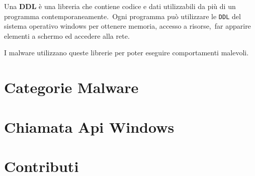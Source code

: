 Una \textbf{DDL} è una libreria che contiene codice e dati utilizzabili da più di un programma contemporaneamente.\
Ogni programma può utilizzare le \texttt{DDL} del sistema operativo windows per ottenere memoria, accesso a risorse,\
far apparire elementi a schermo ed accedere alla rete\cite{Microsoft-DLL}.

I malware utilizzano queste librerie per poter eseguire comportamenti malevoli.

\section{Categorie Malware}



\section{Chiamata Api Windows}


\section{Contributi}

